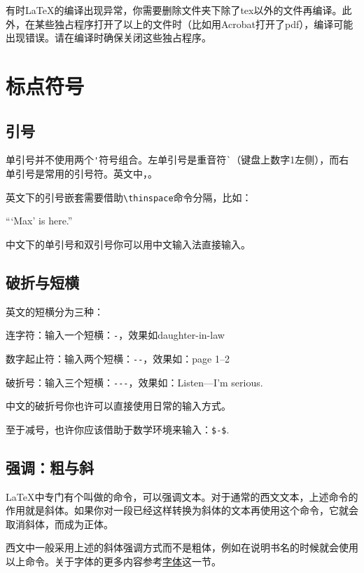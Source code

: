 {有时\LaTeX 的编译出现异常，你需要删除文件夹下除了tex以外的文件再编译。此外，在某些独占程序打开了以上的文件时（比如用Acrobat打开了pdf），编译可能出现错误。请在编译时确保关闭这些独占程序。

\section{标点符号}
\subsection{引号}
单引号并不使用两个\verb|'|符号组合。左单引号是重音符\verb|`|（键盘上数字1左侧），而右单引号是常用的引号符。英文中，。

英文下的引号嵌套需要借助\verb|\thinspace|命令分隔，比如：

\begin{codeshow}
``\thinspace`Max' is here.''
\end{codeshow}

中文下的单引号和双引号你可以用中文输入法直接输入。

\subsection{破折与短横}
英文的短横分为三种：
\begin{feai}
\item 连字符：输入一个短横：\verb|-|，效果如daughter-in-law
\item 数字起止符：输入两个短横：\verb|--|，效果如：page 1--2
\item 破折号：输入三个短横：\verb|---|，效果如：Listen---I'm serious.
\end{feai}

中文的破折号你也许可以直接使用日常的输入方式。

至于减号，也许你应该借助于数学环境来输入：\verb|$-$|. 

\subsection{强调：粗与斜}
\LaTeX 中专门有个叫做的命令，可以强调文本。对于通常的西文文本，上述命令的作用就是斜体。如果你对一段已经这样转换为斜体的文本再使用这个命令，它就会取消斜体，而成为正体。

西文中一般采用上述的斜体强调方式而不是粗体，例如在说明书名的时候就会使用以上命令。关于字体的更多内容参考\hyperref[sec:font]{字体}这一节。

}
